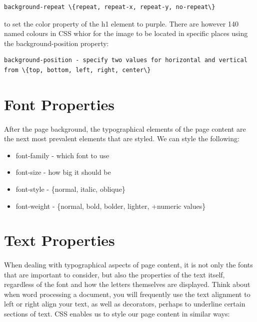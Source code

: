 \begin{lstlisting}
background-repeat \{repeat, repeat-x, repeat-y, no-repeat\}
\end{lstlisting}


 to set the color property of the h1 element to purple. There are however 140 named colours in CSS whior for the image to be located in specific places using the background-position property:

\begin{lstlisting}
background-position - specify two values for horizontal and vertical from \{top, bottom, left, right, center\}
\end{lstlisting}
	

\section{Font Properties}
\paragraph{} After the page background, the typographical elements of the page content are the next most prevalent elements that are styled. We can style the following:

\begin{itemize}
	\item font-family - which font to use
	\item font-size - how big it should be
	\item font-style - \{normal, italic, oblique\}
	\item font-weight - \{normal, bold, bolder, lighter, +numeric values\}
\end{itemize}



\section{Text Properties}
\paragraph{} When dealing with typographical aspects of page content, it is not only the fonts that are important to consider, but also the properties of the text itself, regardless of the font and how the letters themselves are displayed. Think about when word processing a document, you will frequently use the text alignment to left or right align your text, as well as decorators, perhaps to underline certain sections of text. CSS enables us to style our page content in similar ways:

